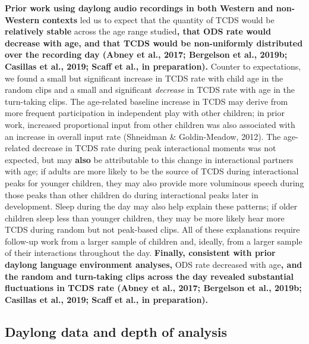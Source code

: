 \documentclass[,man,floatsintext]{apa6}
\begin{document}
\textbf{Prior work using daylong audio recordings in both Western and
non-Western contexts} led us to expect that the quantity of TCDS would
be \textbf{relatively stable} across the age range studied\textbf{, that
ODS rate would decrease with age, and that TCDS would be non-uniformly
distributed over the recording day (Abney et al., 2017; Bergelson et
al., 2019b; Casillas et al., 2019; Scaff et al., in preparation).
}Counter to expectations, we found a small but significant increase in
TCDS rate with child age in the random clips and a small and significant
\emph{decrease} in TCDS rate with age in the turn-taking clips. The
age-related baseline increase in TCDS may derive from more frequent
participation in independent play with other children; in prior work,
increased proportional input from other children was also associated
with an increase in overall input rate (Shneidman \& Goldin-Meadow,
2012). The age-related decrease in TCDS rate during peak interactional
moments was not expected, but may \textbf{also} be attributable to this
change in interactional partners with age; if adults are more likely to
be the source of TCDS during interactional peaks for younger children,
they may also provide more voluminous speech during those peaks than
other children do during interactional peaks later in development. Sleep
during the day may also help explain these patterns; if older children
sleep less than younger children, they may be more likely hear more TCDS
during random but not peak-based clips. All of these explanations
require follow-up work from a larger sample of children and, ideally,
from a larger sample of their interactions throughout the day.
\textbf{Finally, consistent with prior daylong language environment
analyses,} ODS rate decreased with age\textbf{, and the random and
turn-taking clips across the day revealed substantial fluctuations in
TCDS rate (Abney et al., 2017; Bergelson et al., 2019b; Casillas et al.,
2019; Scaff et al., in preparation).}

\subsection{\texorpdfstring{\textbf{Daylong data and depth of
analysis}}{Daylong data and depth of analysis}}\label{daylong-data-and-depth-of-analysis}
\end{document}
